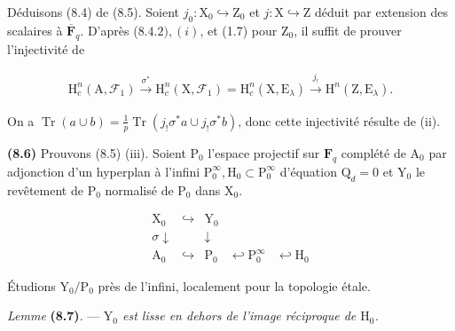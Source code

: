 \documentclass[10pt,leqno]{article}
\begin{document}
\clearpage

\label{physical-33}

\noindent Déduisons (8.4) de (8.5). Soient \(j_{0} : \mathrm{X}_{0} \hookrightarrow  \mathrm{Z}_{0}\) et \(j : \mathrm{X} \hookrightarrow  \mathrm{Z}\) déduit par extension des scalaires à \(\overline{\mathbf{F}}_{q}\). D'après (\(8.4.2), (i)\), et (1.7) pour \(\mathrm{Z}_{0}\), il suffit de prouver l'injectivité de\par

\begin{equation*}\begin{gathered}\mathrm{H}_{c}^{n}(\mathrm{A},\mathcal{F} _{1}) \xrightarrow{\sigma ^{*}} \mathrm{H}_{c}^{n}(\mathrm{X},\mathcal{F} _{1}) = \mathrm{H}_{c}^{n}(\mathrm{X},\mathrm{E}_{\lambda }) \xrightarrow{j_{!}} \mathrm{H}^{n}(\mathrm{Z},\mathrm{E}_{\lambda }).\end{gathered}\end{equation*}

\noindent On a \(\operatorname{Tr}(a \cup  b) = \frac{1}{p} \operatorname{Tr}(j_{!}\sigma ^{*}a \cup  j_{!}\sigma ^{*}b)\), donc cette injectivité résulte de (ii).\par

\noindent \textbf{(8.6)} Prouvons (8.5) (iii). Soient \(\mathrm{P}_{0}\) l'espace projectif sur \(\mathbf{F}_{q}\) complété de \(\mathrm{A}_{0}\) par adjonction d'un hyperplan à l'infini \(\mathrm{P}_{0}^{\infty }, \mathrm{H}_{0} \subset  \mathrm{P}_{0}^{\infty }\) d'équation \(\mathrm{Q}_{d} = 0\) et \(\mathrm{Y}_{0}\) le revêtement de \(\mathrm{P}_{0}\) normalisé de \(\mathrm{P}_{0}\) dans \(\mathrm{X}_{0}\).\par

\[\begin{array}{ccccc}\mathrm X_0&\hookrightarrow&\mathrm Y_0&&\\ {\scriptstyle\sigma}\downarrow&&\downarrow&&\\ \mathrm A_0&\hookrightarrow&\mathrm P_0&\hookleftarrow\mathrm P_0^\infty&\hookleftarrow\mathrm H_0\end{array}\tag{8.6.1}\]

\noindent Étudions \(\mathrm{Y}_{0}/\mathrm{P}_{0}\) près de l'infini, localement pour la topologie étale.\par

\noindent \emph{Lemme} \textbf{(8.7)}. — {\itshape \(\mathrm{Y}_{0}\) est lisse en dehors de l'image réciproque de \(\mathrm{H}_{0}\).}\par
\end{document}
